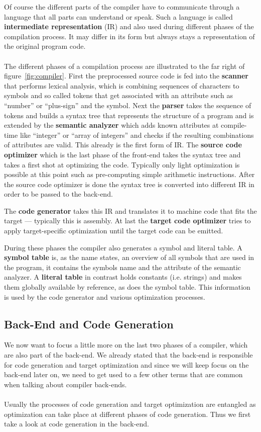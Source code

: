 Of course the different parts of the compiler have to communicate through a language that all parts can understand or speak.
Such a language is called \textbf{intermediate representation} (IR) and also used during different phases of the compilation process.
It may differ in its form but always stays a representation of the original program code.
\\
\\
The different phases of a compilation process are illustrated to the far right of figure~\ref{fig:compiler}.
First the preprocessed source code is fed into the \textbf{scanner} that performs lexical analysis, which is combining sequences of characters to symbols and so called tokens that get associated with an attribute such as ``number'' or ``plus-sign'' and the symbol.
Next the \textbf{parser} takes the sequence of tokens and builds a syntax tree that represents the structure of a program and is extended by the \textbf{semantic analyzer} which adds known attributes at compile-time like ``integer'' or ``array of integers'' and checks if the resulting combinations of attributes are valid.
This already is the first form of IR.
The \textbf{source code optimizer} which is the last phase of the front-end takes the syntax tree and takes a first shot at optimizing the code.
Typically only light optimization is possible at this point such as pre-computing simple arithmetic instructions.
After the source code optimizer is done the syntax tree is converted into different IR in order to be passed to the back-end.

The \textbf{code generator} takes this IR and translates it to machine code that fits the target --- typically this is assembly.
At last the \textbf{target code optimizer} tries to apply target-specific optimization until the target code can be emitted.

During these phases the compiler also generates a symbol and literal table.
A \textbf{symbol table} is, as the name states, an overview of all symbols that are used in the program, it contains the symbols name and the attribute of the semantic analyzer.
A \textbf{literal table} in contrast holds constants (i.e. strings) and makes them globally available by reference, as does the symbol table.
This information is used by the code generator and various optimization processes.

\subsection{Back-End and Code Generation}
We now want to focus a little more on the last two phases of a compiler, which are also part of the back-end.
We already stated that the back-end is responsible for code generation and target optimization and since we will keep focus on the back-end later on, we need to get used to a few other terms that are common when talking about compiler back-ends.
\\
\\
Usually the processes of code generation and target optimization are entangled as optimization can take place at different phases of code generation.
Thus we first take a look at code generation in the back-end.

